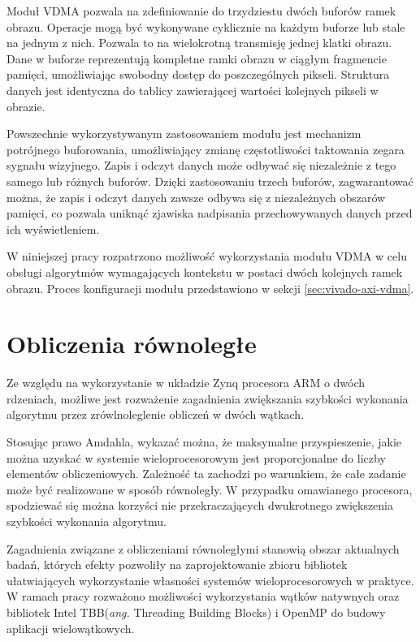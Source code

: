 Moduł VDMA pozwala na zdefiniowanie do trzydziestu dwóch buforów ramek obrazu. 
Operacje mogą być wykonywane cyklicznie na każdym buforze lub stale na jednym z nich. 
Pozwala to na wielokrotną transmisję jednej klatki obrazu.
Dane w buforze reprezentują kompletne ramki obrazu w ciągłym fragmencie pamięci, umożliwiając swobodny dostęp do poszczególnych pikseli. Struktura danych jest identyczna do tablicy zawierającej wartości kolejnych pikseli w obrazie.

Powszechnie wykorzystywanym zastosowaniem modułu jest mechanizm potrójnego buforowania, umożliwiający zmianę częstotliwości taktowania zegara sygnału wizyjnego. 
Zapis i odczyt danych może odbywać się niezależnie z tego samego lub różnych buforów. 
Dzięki zastosowaniu trzech buforów, zagwarantować można, że zapis i odczyt danych zawsze odbywa się z niezależnych obszarów pamięci, co pozwala uniknąć zjawiska nadpisania przechowywanych danych przed ich wyświetleniem.

W niniejszej pracy rozpatrzono możliwość wykorzystania modułu VDMA w celu obsługi algorytmów wymagających kontekstu w postaci dwóch kolejnych ramek obrazu.
Proces konfiguracji modułu przedstawiono w sekcji \ref{sec:vivado-axi-vdma}.

\section{Obliczenia równoległe}
\label{sec:openmp}

Ze względu na wykorzystanie w układzie Zynq procesora ARM o dwóch rdzeniach, możliwe jest rozważenie zagadnienia zwiększania szybkości wykonania algorytmu przez zrówlnoleglenie obliczeń w dwóch wątkach. %

Stosując prawo Amdahla, wykazać można, że maksymalne przyspieszenie, jakie można uzyskać w systemie wieloprocesorowym jest proporcjonalne do liczby elementów obliczeniowych. 
Zależność ta zachodzi po warunkiem, że całe zadanie może być realizowane w sposób równoległy. 
W przypadku omawianego procesora, spodziewać się można korzyści nie przekraczających dwukrotnego zwiększenia szybkości wykonania algorytmu.

Zagadnienia związane z obliczeniami równoległymi stanowią obszar aktualnych badań, których efekty pozwoliły na zaprojektowanie zbioru bibliotek ułatwiających wykorzystanie własności systemów wieloprocesorowych w praktyce. 
W ramach pracy rozważono możliwości wykorzystania wątków natywnych oraz bibliotek Intel TBB(\emph{ang.} Threading Building Blocks) i OpenMP do budowy aplikacji wielowątkowych.

